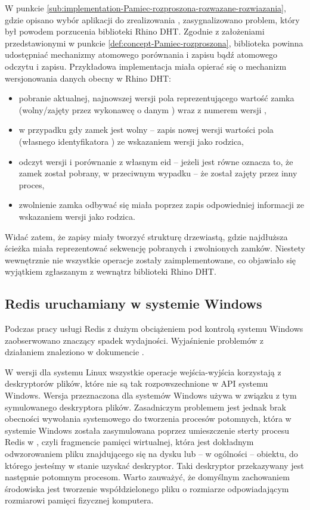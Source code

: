 \label{par:problemy-rhino-dht}W punkcie \ref{sub:implementation-Pamiec-rozproszona-rozwazane-rozwiazania},
gdzie opisano wybór aplikacji do zrealizowania ,
zasygnalizowano problem, który był powodem porzucenia biblioteki Rhino
DHT. Zgodnie z założeniami przedstawionymi w punkcie \ref{def:concept-Pamiec-rozproszona},
biblioteka powinna udostępniać mechanizmy atomowego porównania i zapisu
bądź atomowego odczytu i zapisu. Przykładowa implementacja 
miała opierać się o mechanizm wersjonowania danych obecny w Rhino
DHT:
\begin{itemize}
\item pobranie aktualnej, najnowszej wersji pola reprezentującego wartość
zamka (wolny/zajęty przez wykonawcę o danym ) wraz z
numerem wersji ,
\item w przypadku gdy zamek jest wolny -- zapis nowej wersji wartości pola
(własnego identyfikatora ) ze wskazaniem wersji 
jako rodzica,
\item odczyt wersji  i porównanie z własnym eid -- jeżeli
jest równe oznacza to, że zamek został pobrany, w przeciwnym wypadku
-- że został zajęty przez inny proces,
\item zwolnienie zamka odbywać się miała poprzez zapis odpowiedniej informacji
ze wskazaniem wersji  jako rodzica.
\end{itemize}
Widać zatem, że zapisy miały tworzyć strukturę drzewiastą, gdzie najdłuższa
ścieżka miała reprezentować sekwencję pobranych i zwolnionych zamków.
Niestety wewnętrznie nie wszystkie operacje zostały zaimplementowane,
co objawiało się wyjątkiem  zgłaszanym
z wewnątrz biblioteki Rhino DHT.


\subsection{Redis uruchamiany w systemie Windows}

\label{par:problemy-Windows-Redis}Podczas pracy usługi Redis z dużym
obciążeniem pod kontrolą systemu Windows zaobserwowano znaczący spadek
wydajności. Wyjaśnienie problemów z działaniem znaleziono w dokumencie
\cite{MSOpenTech-Redis-Release-Notes}. 

W wersji dla systemu Linux wszystkie operacje wejścia-wyjścia korzystają
z deskryptorów plików, które nie są tak rozpowszechnione w API systemu
Windows. Wersja przeznaczona dla systemów Windows używa w związku
z tym symulowanego deskryptora plików. Zasadniczym problemem jest
jednak brak obecności wywołania systemowego  do tworzenia
procesów potomnych, która w systemie Windows została zasymulowana
poprzez umieszczenie sterty procesu Redis w ,
czyli fragmencie pamięci wirtualnej, która jest dokładnym odwzorowaniem
pliku znajdującego się na dysku lub -- w ogólności -- obiektu, do
którego jesteśmy w stanie uzyskać deskryptor. Taki deskryptor przekazywany
jest następnie potomnym procesom. Warto zauważyć, że domyślnym zachowaniem
środowiska jest tworzenie współdzielonego pliku o rozmiarze odpowiadającym
rozmiarowi pamięci fizycznej komputera. 

